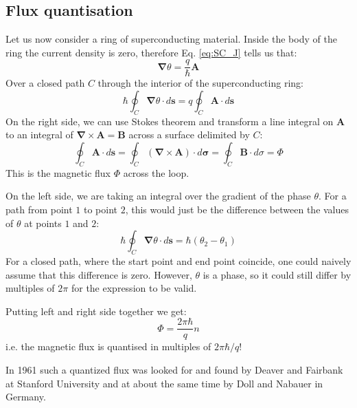 \documentclass[a4paper,11pt]{article}
\begin{document}
\subsection {Flux quantisation}
Let us now consider a ring of superconducting material. Inside the body of the ring the current density is zero, therefore Eq. \ref{eq:SC_J} tells us that:
\begin{equation}
    \mathbf{\nabla} \theta = \frac{q}{\hbar} \mathbf{A}
\end{equation}
Over a closed path $C$ through the interior of the superconducting ring:
\begin {equation}
\hbar \oint_C \mathbf{\nabla} \theta \cdot d\mathbf{s} = q \oint_C \mathbf{A} \cdot d\mathbf{s}
\end{equation}
On the right side, we can use Stokes theorem and transform a line integral on $\mathbf{A}$ to an integral of $\mathbf{\nabla} \times \mathbf{A} = \mathbf{B}$ across a surface delimited by $C$:
\begin{equation}
    \oint_C \mathbf{A} \cdot d\mathbf{s} = \oint_C (\mathbf{\nabla} \times \mathbf{A}) \cdot d\mathbf\sigma = \oint_C \mathbf{B} \cdot d\sigma = \Phi
\end{equation}
This is the magnetic flux $\Phi$ across the loop.

On the left side, we are taking an integral over the gradient of the phase $\theta$. For a path from point $1$ to point $2$, this would just be the difference between the values of $\theta$ at points $1$ and $2$:
\begin{equation}
    \hbar \oint_C \mathbf{\nabla} \theta \cdot d\mathbf{s} = \hbar \left( \theta_2 - \theta_1 \right)
\end{equation}
For a closed path, where the start point and end point coincide, one could naively assume that this difference is zero. However, $\theta$ is a phase, so it could still differ by multiples of $2\pi$ for the expression to be valid.

Putting left and right side together we get:
\begin{equation}
    \Phi = \frac{2\pi \hbar}{q} n
\end{equation}
i.e. the magnetic flux is quantised in multiples of $2 \pi \hbar/q$!

In 1961 such a quantized flux was looked for and found by Deaver and Fairbank at Stanford University and at about the same time by Doll and Nabauer in Germany.
\end{document}

